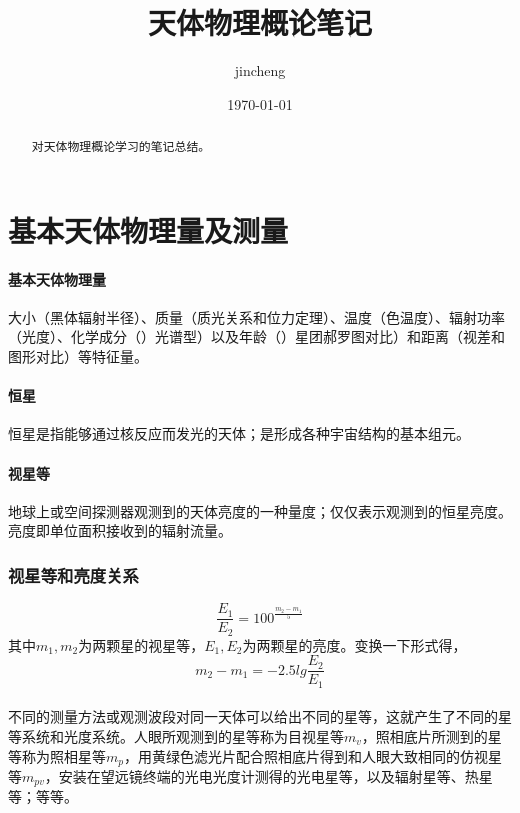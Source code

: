 \documentclass[%
 reprint,
 amsmath,amssymb,
 aps,
]{revtex4-1}
\begin{document}

\title{天体物理概论笔记}
\author{jincheng}
%

\date{\today}

\begin{abstract}
对天体物理概论学习的笔记总结。
\end{abstract}

\maketitle

\section{\label{sec:level1}基本天体物理量及测量}
	
\paragraph{基本天体物理量}大小（黑体辐射半径）、质量（质光关系和位力定理）、温度（色温度）、辐射功率（光度）、化学成分（）光谱型）以及年龄（）星团郝罗图对比）和距离（视差和图形对比）等特征量。

\paragraph{恒星}恒星是指能够通过核反应而发光的天体；是形成各种宇宙结构的基本组元。

\paragraph{视星等}地球上或空间探测器观测到的天体亮度的一种量度；仅仅表示观测到的恒星亮度。亮度即单位面积接收到的辐射流量。

\subsubsection{视星等和亮度关系}
$$\frac{E_1}{E_2} = 100^{\frac{m_2 - m_1}{5}}$$
其中$m_1,m_2$为两颗星的视星等，$E_1,E_2$为两颗星的亮度。变换一下形式得，$$m_2 - m_1 = - 2.5lg \frac{E_2}{E_1}$$

\paragraph{}不同的测量方法或观测波段对同一天体可以给出不同的星等，这就产生了不同的星等系统和光度系统。人眼所观测到的星等称为目视星等$m_v$，照相底片所测到的星等称为照相星等$m_p$，用黄绿色滤光片配合照相底片得到和人眼大致相同的仿视星等$m_{pv}$，安装在望远镜终端的光电光度计测得的光电星等，以及辐射星等、热星等；等等。
\end{document}

